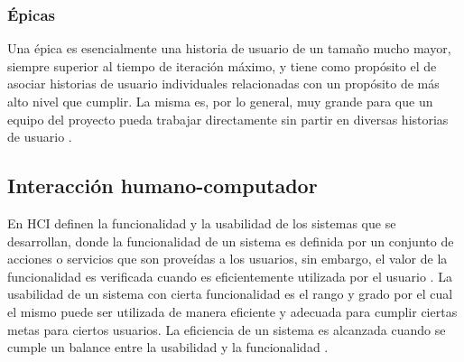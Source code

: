 


\subsubsection{Épicas}
Una épica es esencialmente una historia de usuario de un tamaño mucho mayor, siempre superior al tiempo de iteración máximo, y tiene como propósito el de asociar historias de usuario individuales relacionadas con un propósito de más alto nivel que cumplir. La misma es, por lo general, muy grande para que un equipo del proyecto pueda trabajar directamente sin partir en diversas historias de usuario \citep{cobb2015project}.


\subsection{Interacción humano-computador}
En HCI definen la funcionalidad y la usabilidad de los sistemas que se desarrollan, donde la funcionalidad de un sistema es definida por un conjunto de acciones o servicios que son proveídas a los usuarios, sin embargo, el valor de la funcionalidad es verificada cuando es eficientemente utilizada por el usuario \citep{shneiderman_designing_2010}. La usabilidad de un sistema con cierta funcionalidad es el rango y grado por el cual el mismo puede ser utilizada de manera eficiente y adecuada para cumplir ciertas metas para ciertos usuarios. La eficiencia de un sistema es alcanzada cuando se cumple un balance entre la usabilidad y la funcionalidad \citep{nielsen_usability_2010}.

